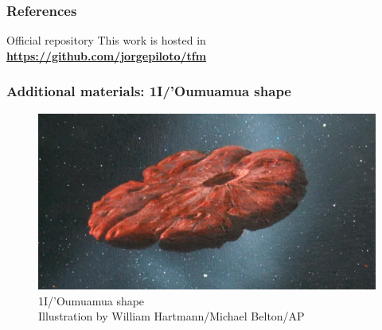 \documentclass[xcolor={dvipsnames}]{beamer}
\begin{document}
\begin{frame}
\frametitle{References}

\begin{alertblock}{Official repository}
\vspace{0.2cm}
This work is hosted in \textbf{\href{https://github.com/jorgepiloto/tfm}{https://github.com/jorgepiloto/tfm}}
\vspace{0.2cm}
\end{alertblock}

\end{frame}

\begin{frame}
\frametitle{Additional materials: 1I/'Oumuamua shape}

\begin{figure}[h]
    \centering
    \includegraphics[width=\textwidth]{fig/static/oumuamua-shape.png}
        \caption{1I/'Oumuamua shape\\\tiny{Illustration by William Hartmann/Michael Belton/AP}}
    \label{fig:oumuamua-shape}
\end{figure}

\end{frame}
\end{document}

